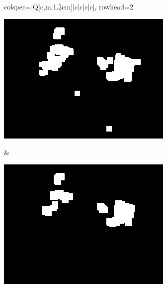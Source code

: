 \begin{longtblr}[
            caption = {Hasil uji coba proses \textit{background subtraction} menggunakan GMM yang disempurnakan oleh Operasi Morfologi},
            label = {tab:gmm_morph_9908}
        ]{
            colspec={|Q[c,m,1.2cm]|c|c|c|c|},
            rowhead=2
        }
\begin{minipage}{0.19\textwidth}
                \includegraphics[width=\linewidth]{image/gt_116/gt_116_dilated_5x11_frame1167.jpg}
            \end{minipage} & 
            \begin{minipage}{0.19\textwidth}
                \includegraphics[width=\linewidth]{image/gt_116/gt_116_dilated_7x13_frame1167.jpg}
            \end{minipage} \\
            \hline
        \end{longtblr}
    
